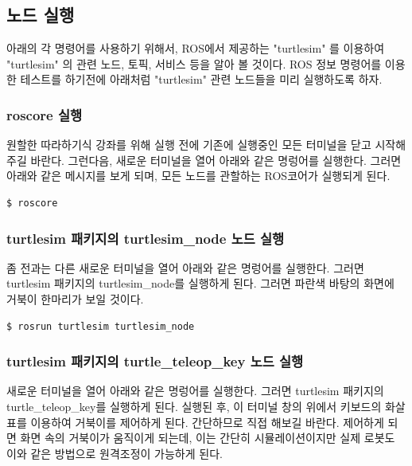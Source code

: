 \subsection{노드 실행}

아래의 각 명령어를 사용하기 위해서, ROS에서 제공하는 "turtlesim" 를 이용하여 "turtlesim" 의 관련 노드, 토픽, 서비스 등을 알아 볼 것이다. ROS 정보 명령어를 이용한 테스트를 하기전에 아래처럼 "turtlesim" 관련 노드들을 미리 실행하도록 하자.

\subsubsection{roscore 실행}

원할한 따라하기식 강좌를 위해 실행 전에 기존에 실행중인 모든 터미널을 닫고 시작해 주길 바란다. 그런다음, 새로운 터미널을 열어 아래와 같은 명렁어를 실행한다. 그러면 아래와 같은 메시지를 보게 되며, 모든 노드를 관할하는 ROS코어가 실행되게 된다.

\begin{lstlisting}[language=ROS]
$ roscore
\end{lstlisting}

\subsubsection{turtlesim 패키지의 turtlesim\_node 노드 실행}

좀 전과는 다른 새로운 터미널을 열어 아래와 같은 명렁어를 실행한다. 그러면 turtlesim 패키지의 turtlesim\_node를 실행하게 된다. 그러면 파란색 바탕의 화면에 거북이 한마리가 보일 것이다.

\begin{lstlisting}[language=ROS]
$ rosrun turtlesim turtlesim_node 
\end{lstlisting}

\subsubsection{turtlesim 패키지의 turtle\_teleop\_key 노드 실행}

새로운 터미널을 열어 아래와 같은 명렁어를 실행한다. 그러면 turtlesim 패키지의 turtle\_teleop\_key를 실행하게 된다. 실행된 후, 이 터미널 창의 위에서 키보드의 화살표를 이용하여 거북이를 제어하게 된다. 간단하므로 직접 해보길 바란다. 제어하게 되면 화면 속의 거북이가 움직이게 되는데, 이는 간단히 시뮬레이션이지만 실제 로봇도 이와 같은 방법으로 원격조정이 가능하게 된다.

